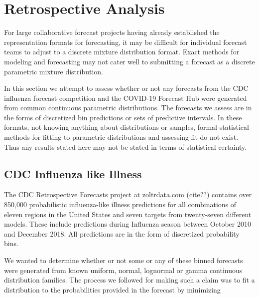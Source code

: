 \documentclass[11pt,notitlepage]{isuthesis}
\begin{document}





















\section{Retrospective Analysis}
\label{section:retrostud}

For large collaborative forecast projects having already established the 
representation formats for forecasting, it may be difficult for individual
forecast teams to adjust to a discrete mixture distribution format. Exact 
methods for modeling and forecasting may not cater well to submitting a forecast
as a discrete parametric mixture distribution.

In this section we attempt to assess whether or not any forecasts from the CDC
influenza forecast competition and the COVID-19 Forecast Hub were generated from
common continuous parametric distributions. The forecasts we assess are in the 
forms of discretized bin predictions or sets of predictive intervals. In these
formats, not knowing anything about distributions or samples,  formal 
statistical methods for fitting to parametric distributions 
and assessing fit do not exist. Thus any results stated here may not be stated
in terms of statistical certainty.


\subsection{CDC Influenza like Illness}
The CDC Retrospective Forecasts project at zoltrdata.com (cite??) contains over
850,000 probabilistic influenza-like illness predictions for all combinations
of eleven regions 
in the United States and seven targets from twenty-seven different models. These
include predictions during Influenza season between October 2010 and December
2018. All predictions are in the form of discretized probability bins. 

We wanted to determine whether or not some or any of these binned forecasts were
generated from known uniform, normal, 
lognormal or gamma continuous distribution families. 
The process we followed for making such a claim was
to fit a distribution to the probabilities provided in the forecast by
minimizing
\end{document}
